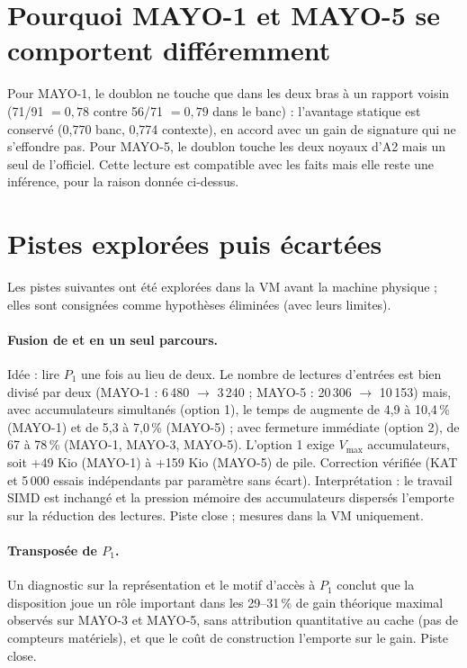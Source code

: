 \section{Pourquoi MAYO-1 et MAYO-5 se comportent différemment}
\I{} Pour MAYO-1, le doublon ne touche que  dans les deux bras à un rapport voisin (71/91 $=0{,}78$ contre 56/71 $=0{,}79$ dans le banc) : l'avantage statique est conservé (0,770 banc, 0,774 contexte), en accord avec un gain de signature qui ne s'effondre pas. Pour MAYO-5, le doublon touche les deux noyaux d'A2 mais un seul de l'officiel. Cette lecture est compatible avec les faits mais elle reste une inférence, pour la raison donnée ci-dessus.

\section{Pistes explorées puis écartées}
Les pistes suivantes ont été explorées dans la VM avant la machine physique ; elles sont consignées comme hypothèses éliminées (avec leurs limites).

\paragraph{Fusion de  et  en un seul parcours.} Idée : lire $P_1$ une fois au lieu de deux. Le nombre de lectures d'entrées est bien divisé par deux (MAYO-1 : 6\,480 $\to$ 3\,240 ; MAYO-5 : 20\,306 $\to$ 10\,153) mais, avec accumulateurs simultanés (option 1), le temps de  augmente de 4,9 à 10,4\,\% (MAYO-1) et de 5,3 à 7,0\,\% (MAYO-5) ; avec fermeture immédiate (option 2), de 67 à 78\,\% (MAYO-1, MAYO-3, MAYO-5). L'option 1 exige $V_{\max}$ accumulateurs, soit +49 Kio (MAYO-1) à +159 Kio (MAYO-5) de pile. Correction vérifiée (KAT et 5\,000 essais indépendants par paramètre sans écart). Interprétation : le travail SIMD est inchangé et la pression mémoire des accumulateurs dispersés l'emporte sur la réduction des lectures. Piste close ; mesures dans la VM uniquement.

\paragraph{Transposée de $P_1$.} Un diagnostic sur la représentation et le motif d'accès à $P_1$ conclut que la disposition joue un rôle important dans les 29--31\,\% de gain théorique maximal observés sur MAYO-3 et MAYO-5, sans attribution quantitative au cache (pas de compteurs matériels), et que le coût de construction l'emporte sur le gain. Piste close.

